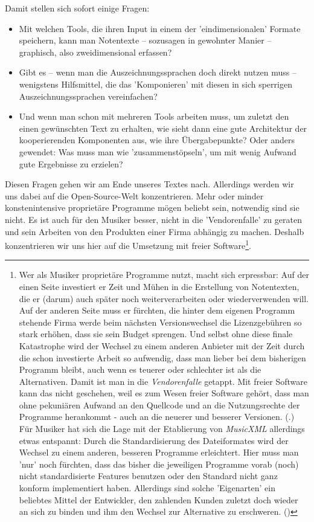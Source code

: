 Damit stellen sich sofort einige Fragen:

\begin{itemize}
  \item Mit welchen Tools, die ihren Input in einem der 'eindimensionalen'
  Formate speichern, kann man Notentexte -- sozusagen in gewohnter Manier
  -- graphisch, also zweidimensional erfassen?
  \item Gibt es -- wenn man die Auszeichnungssprachen doch direkt nutzen muss --
  wenigstens Hilfsmittel, die das 'Komponieren' mit diesen in sich sperrigen
  Auszeichnungssprachen vereinfachen?
  \item Und wenn man schon mit mehreren Tools arbeiten muss, um zuletzt den
  einen gewünschten Text zu erhalten, wie sieht dann eine gute Architektur der
  kooperierenden Komponenten aus, wie ihre Übergabepunkte? Oder anders gewendet:
  Was muss man wie 'zusammenstöpseln', um mit wenig Aufwand gute Ergebnisse zu
  erzielen?
\end{itemize}

Diesen Fragen gehen wir am Ende unseres Textes nach. Allerdings werden wir uns
dabei auf die Open-Source-Welt konzentrieren. Mehr oder minder konstenintensive
proprietäre Programme mögen beliebt sein, notwendig sind sie nicht. Es ist auch
für den Musiker besser, nicht in die 'Vendorenfalle' zu geraten und sein Arbeiten
von den Produkten einer Firma abhängig zu machen. Deshalb konzentrieren wir uns
hier auf die Umsetzung mit freier Software\footnote{Wer als Musiker proprietäre
Programme nutzt, macht sich erpressbar: Auf der einen Seite investiert er Zeit
und Mühen in die Erstellung von Notentexten, die er (darum) auch später noch
weiterverarbeiten oder wiederverwenden will. Auf der anderen Seite muss er
fürchten, die hinter dem eigenen Programm stehende Firma werde beim nächsten
Versionswechsel die Lizenzgebühren so stark erhöhen, dass sie sein Budget
sprengen. Und selbst ohne diese finale Katastrophe wird der Wechsel zu einem
anderen Anbieter mit der Zeit durch die schon investierte Arbeit so aufwendig,
dass man lieber bei dem bisherigen Programm bleibt, auch wenn es teuerer oder
schlechter ist als die Alternativen. Damit ist man in die \textit{Vendorenfalle}
getappt. Mit freier Software kann das nicht geschehen, weil es zum Wesen freier
Software gehört, dass man ohne pekuniären Aufwand an den Quellcode und an die
Nutzungsrechte der Programme herankommt - auch an die neuerer und besserer
Versionen. (\cite[vgl. dazu][\nopage wp]{FSF2018a}.) Für Musiker hat sich die
Lage mit der Etablierung von \textit{MusicXML} allerdings etwas entspannt: Durch
die Standardisierung des Dateiformates wird der Wechsel zu einem anderen,
besseren Programme erleichtert. Hier muss man 'nur' noch fürchten, dass das
bisher die jeweiligen Programme vorab (noch) nicht standardisierte Features
benutzen oder den Standard nicht ganz konform implementiert haben. Allerdings
sind solche 'Eigenarten' ein beliebtes Mittel der Entwickler, den zahlenden
Kunden zuletzt doch wieder an sich zu binden und ihm den Wechsel zur Alternative
zu erschweren. (\cite[Zur Lizenzierung von MusicXML vgl. auch][\nopage
wp.]{WpedMusicXML2018a})}.

